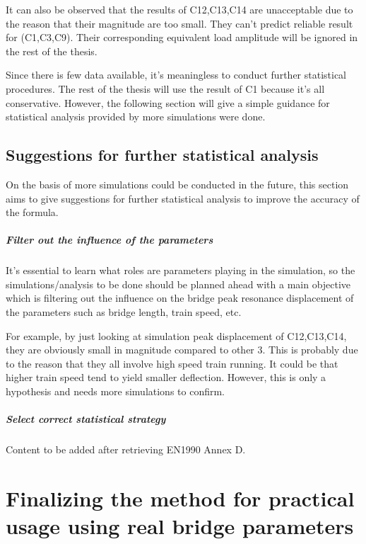 It can also be observed that the results of C12,C13,C14 are unacceptable due to the reason that their magnitude are too small. They can't predict reliable result for (C1,C3,C9). Their corresponding equivalent load amplitude will be ignored in the rest of the thesis.

Since there is few data available, it's meaningless to conduct further statistical procedures. The rest of the thesis will use the result of C1 because it's all conservative. However, the following section will give a simple guidance for statistical analysis provided by more simulations were done.

\section{Suggestions for further statistical analysis }

On the basis of more simulations could be conducted in the future, this section aims to give suggestions for further statistical analysis to improve the accuracy of the formula.

\paragraph{Filter out the influence of the parameters} It's essential to learn what roles are parameters playing in the simulation, so the simulations/analysis to be done should be planned ahead with a main objective which is  filtering out the influence on the bridge peak resonance displacement of the parameters such as bridge length, train speed, etc.

For example, by just looking at simulation peak displacement of C12,C13,C14, they are obviously small in magnitude compared to other 3. This is probably due to the reason that they all involve high speed train running. It could be that higher train speed tend to yield smaller deflection. However, this is only a hypothesis and needs more simulations to confirm.

\paragraph{Select correct statistical strategy} 

Content to be added after retrieving EN1990 Annex D.


\chapter{Finalizing the method for practical usage using real bridge parameters}

